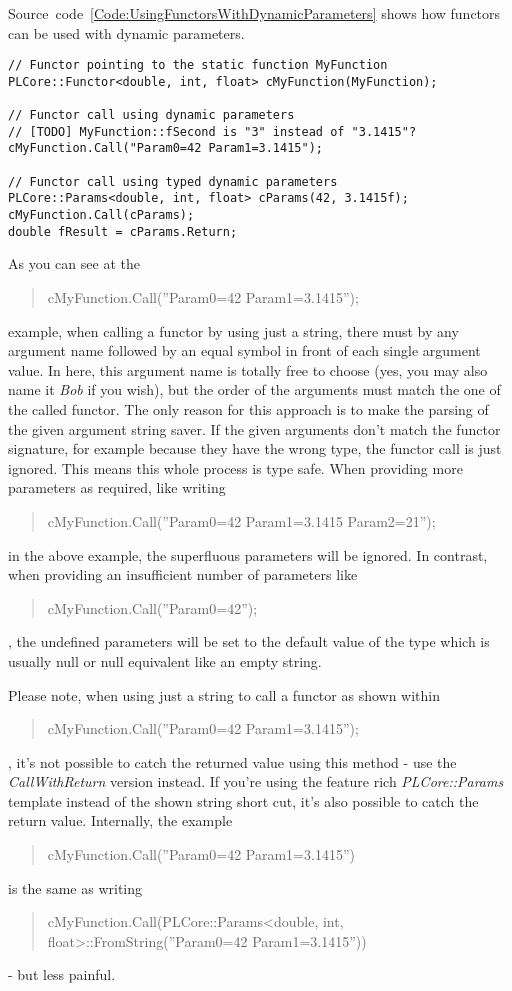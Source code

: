 Source~code~\ref{Code:UsingFunctorsWithDynamicParameters} shows how functors can be used with dynamic parameters.
\begin{lstlisting}[float=htb,label=Code:UsingFunctorsWithDynamicParameters,caption={Using functors with dynamic parameters}]
// Functor pointing to the static function MyFunction
PLCore::Functor<double, int, float> cMyFunction(MyFunction);

// Functor call using dynamic parameters
// [TODO] MyFunction::fSecond is "3" instead of "3.1415"?
cMyFunction.Call("Param0=42 Param1=3.1415");

// Functor call using typed dynamic parameters
PLCore::Params<double, int, float> cParams(42, 3.1415f);
cMyFunction.Call(cParams);
double fResult = cParams.Return;
\end{lstlisting}
As you can see at the \begin{quote}cMyFunction.Call(''Param0=42 Param1=3.1415'');\end{quote} example, when calling a functor by using just a string, there must by any argument name followed by an equal symbol in front of each single argument value. In here, this argument name is totally free to choose (yes, you may also name it \emph{Bob} if you wish), but the order of the arguments must match the one of the called functor. The only reason for this approach is to make the parsing of the given argument string saver. If the given arguments don't match the functor signature, for example because they have the wrong type, the functor call is just ignored. This means this whole process is type safe. When providing more parameters as required, like writing \begin{quote}cMyFunction.Call(''Param0=42 Param1=3.1415 Param2=21'');\end{quote} in the above example, the superfluous parameters will be ignored. In contrast, when providing an insufficient number of parameters like \begin{quote}cMyFunction.Call(''Param0=42'');\end{quote}, the undefined parameters will be set to the default value of the type which is usually null or null equivalent like an empty string.

Please note, when using just a string to call a functor as shown within \begin{quote}cMyFunction.Call(''Param0=42 Param1=3.1415'');\end{quote}, it's not possible to catch the returned value using this method - use the \emph{CallWithReturn} version instead. If you're using the feature rich \emph{PLCore::Params} template instead of the shown string short cut, it's also possible to catch the return value. Internally, the example \begin{quote}cMyFunction.Call(''Param0=42 Param1=3.1415'')\end{quote} is the same as writing \begin{quote}cMyFunction.Call(PLCore::Params<double, int, float>::FromString(''Param0=42 Param1=3.1415''))\end{quote} - but less painful.

